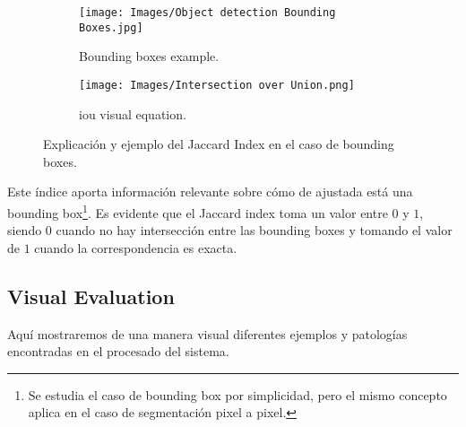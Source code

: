\begin{figure}[ht]
  \begin{subfigure}[b]{.45\textwidth}
    \centering
    \texttt{[image: Images/Object detection Bounding Boxes.jpg]}
    \caption{Bounding boxes example.}
  \end{subfigure}\hfill
  \begin{subfigure}[b]{.45\textwidth}
    \centering
    \texttt{[image: Images/Intersection over Union.png]}
    \caption{\gls{iou} visual equation.}
  \end{subfigure}
  \caption[Explicación del Jaccard Index]{Explicación y ejemplo del Jaccard
    Index en el caso de bounding boxes.}
\end{figure}

Este índice aporta información relevante sobre cómo de ajustada está una
bounding box\footnote{Se estudia el caso de bounding box por simplicidad, pero
  el mismo concepto aplica en el caso de segmentación pixel a pixel.}. Es
evidente que el Jaccard index toma un valor entre \(0\) y \(1\), siendo \(0\)
cuando no hay intersección entre las bounding boxes y tomando el valor de \(1\)
cuando la correspondencia es exacta.

\subsection{Visual Evaluation}

Aquí mostraremos de una manera visual diferentes ejemplos y patologías
encontradas en el procesado del sistema.
